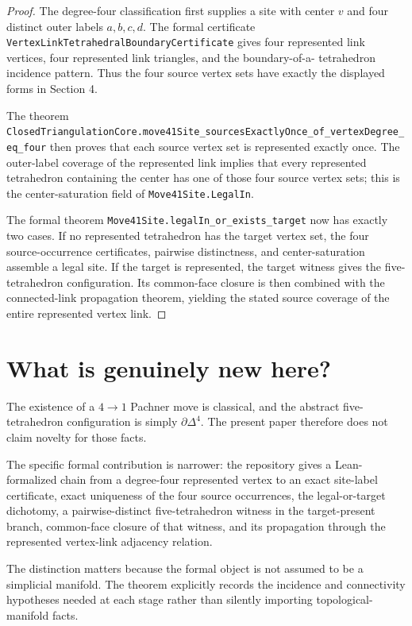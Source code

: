 \documentclass[11pt]{article}
\theoremstyle{definition}
\theoremstyle{remark}
\begin{document}
\begin{proof}
The degree-four classification first supplies a site with center $v$ and four
distinct outer labels $a,b,c,d$.  The formal certificate
\texttt{\small VertexLinkTetrahedralBoundaryCertificate} gives four represented
link vertices, four represented link triangles, and the boundary-of-a-
tetrahedron incidence pattern.  Thus the four source vertex sets have
exactly the displayed forms in Section 4.

The theorem
\texttt{\small ClosedTriangulationCore.move41Site\_sourcesExactlyOnce\_of\_vertexDegree\_eq\_four}
then proves that each source vertex set is represented exactly once.  The
outer-label coverage of the represented link implies that every represented
tetrahedron containing the center has one of those four source vertex sets;
this is the center-saturation field of \texttt{\small Move41Site.LegalIn}.

The formal theorem \texttt{\small Move41Site.legalIn\_or\_exists\_target} now has
exactly two cases.  If no represented tetrahedron has the target vertex set,
the four source-occurrence certificates, pairwise distinctness, and
center-saturation assemble a legal site.  If the target is represented, the
target witness gives the five-tetrahedron configuration.  Its common-face
closure is then combined with the connected-link propagation theorem,
yielding the stated source coverage of the entire represented vertex link.
\end{proof}
\section{What is genuinely new here?}

The existence of a $4\to1$ Pachner move is classical, and the abstract
five-tetrahedron configuration is simply $\partial\Delta^4$.  The present
paper therefore does not claim novelty for those facts.

The specific formal contribution is narrower: the repository gives a
Lean-formalized chain from a degree-four represented vertex to an exact
site-label certificate, exact uniqueness of the four source occurrences,
the legal-or-target dichotomy, a pairwise-distinct five-tetrahedron witness
in the target-present branch, common-face closure of that witness, and its
propagation through the represented vertex-link adjacency relation.

The distinction matters because the formal object is not assumed to be a
simplicial manifold.  The theorem explicitly records the incidence and
connectivity hypotheses needed at each stage rather than silently importing
topological-manifold facts.
\end{document}
